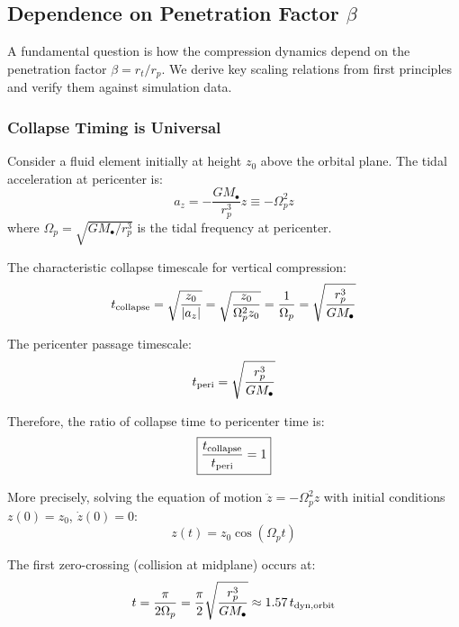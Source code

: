 \documentclass[twocolumn,amsmath,amssymb,prd,superscriptaddress,nofootinbib]{revtex4-2}
\begin{document}
\subsection{Dependence on Penetration Factor $\beta$}
\label{sec:beta_dependence}

A fundamental question is how the compression dynamics depend on the penetration factor $\beta = r_t/r_p$. We derive key scaling relations from first principles and verify them against simulation data.

\subsubsection{Collapse Timing is Universal}

Consider a fluid element initially at height $z_0$ above the orbital plane. The tidal acceleration at pericenter is:
\begin{equation}
    a_z = -\frac{GM_\bullet}{r_p^3} z \equiv -\Omega_p^2 z
\end{equation}
where $\Omega_p = \sqrt{GM_\bullet/r_p^3}$ is the tidal frequency at pericenter.

The characteristic collapse timescale for vertical compression:
\begin{equation}
    t_{\rm collapse} = \sqrt{\frac{z_0}{|a_z|}} = \sqrt{\frac{z_0}{\Omega_p^2 z_0}} = \frac{1}{\Omega_p} = \sqrt{\frac{r_p^3}{GM_\bullet}}
    \label{eq:t_collapse}
\end{equation}

The pericenter passage timescale:
\begin{equation}
    t_{\rm peri} = \sqrt{\frac{r_p^3}{GM_\bullet}}
    \label{eq:t_peri}
\end{equation}

Therefore, the ratio of collapse time to pericenter time is:
\begin{equation}
    \boxed{\frac{t_{\rm collapse}}{t_{\rm peri}} = 1}
    \label{eq:timing_ratio}
\end{equation}

More precisely, solving the equation of motion $\ddot{z} = -\Omega_p^2 z$ with initial conditions $z(0) = z_0$, $\dot{z}(0) = 0$:
\begin{equation}
    z(t) = z_0 \cos(\Omega_p t)
\end{equation}

The first zero-crossing (collision at midplane) occurs at:
\begin{equation}
    t = \frac{\pi}{2\Omega_p} = \frac{\pi}{2} \sqrt{\frac{r_p^3}{GM_\bullet}} \approx 1.57 \, t_{\rm dyn,orbit}
\end{equation}
\end{document}
